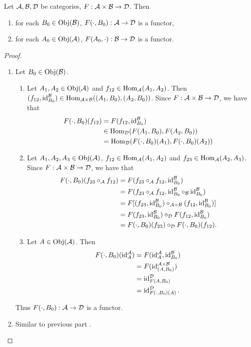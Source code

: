 \documentclass{book}
\begin{document}
	\begin{ex} 
		Let $\mathcal{A}, \mathcal{B}, \mathcal{D}$ be categories, $F: \mathcal{A} \times \mathcal{B} \rightarrow \mathcal{D}$. Then 
		\begin{enumerate}
			\item for each $B_0 \in \operatorname{Obj}(\mathcal{B})$, $F(\cdot, B_0): \mathcal{A} \rightarrow \mathcal{D}$ is a functor,
			\item for each $A_0 \in \operatorname{Obj}(\mathcal{A})$, $F(A_0, \cdot): \mathcal{B} \rightarrow \mathcal{D}$ is a functor.
		\end{enumerate}
	\end{ex}
	
	\begin{proof}\
		\begin{enumerate}
			\item Let $B_0 \in \operatorname{Obj}(\mathcal{B})$.
			\begin{enumerate}
				\item Let $A_1, A_2 \in \operatorname{Obj}(\mathcal{A})$ and $f_{12} \in \operatorname{Hom}_{\mathcal{A}}(A_1, A_2)$. Then $(f_{12}, \operatorname{id}_{B_0}^{\mathcal{B}}) \in \operatorname{Hom}_{\mathcal{A} \times \mathcal{B}}((A_1, B_0), (A_2, B_0))$. Since $F:\mathcal{A} \times \mathcal{B} \rightarrow \mathcal{D}$, we have that
				\begin{align*}
					F(\cdot, B_0)(f_{12})
					& = F(f_{12}, \operatorname{id}_{B_0}^{\mathcal{B}}) \\
					& \in \operatorname{Hom}_{\mathcal{D}}(F(A_1, B_0), F(A_2, B_0)) \\
					& = \operatorname{Hom}_{\mathcal{D}}(F(\cdot, B_0)(A_1), F(\cdot, B_0)(A_2)) \\
				\end{align*}
				\item Let $A_1, A_2, A_3 \in \operatorname{Obj}(\mathcal{A})$, $f_{12} \in \operatorname{Hom}_{\mathcal{A}}(A_1, A_2)$ and $f_{23} \in \operatorname{Hom}_{\mathcal{A}}(A_2, A_3)$. Since $F:\mathcal{A} \times \mathcal{B} \rightarrow \mathcal{D}$, we have that
				\begin{align*}
					F(\cdot, B_0)(f_{23} \circ_{\mathcal{A}} f_{12})
					& = F(f_{23} \circ_{\mathcal{A}} f_{12}, \operatorname{id}_{B_0}^{\mathcal{B}}) \\
					& = F(f_{23} \circ_{\mathcal{A}} f_{12}, \operatorname{id}_{B_0}^{\mathcal{B}} \circ_{\mathcal{B}} \operatorname{id}_{B_0}^{\mathcal{B}}) \\
					& = F[(f_{23}, \operatorname{id}_{B_0}^{\mathcal{B}}) \circ_{\mathcal{A} \times \mathcal{B}} (f_{12}, \operatorname{id}_{B_0}^{\mathcal{B}})] \\
					& = F(f_{23}, \operatorname{id}_{B_0}^{\mathcal{B}}) \circ_{\mathcal{D}} F(f_{12}, \operatorname{id}_{B_0}^{\mathcal{B}}) \\
					& = F(\cdot, B_0)(f_{23}) \circ_{\mathcal{D}} F(\cdot, B_0)(f_{12}).
				\end{align*} 
				\item Let $A \in \operatorname{Obj}(\mathcal{A})$. Then 
				\begin{align*}
					F(\cdot, B_0)(\operatorname{id}_A^{\mathcal{A}}) 
					& = F(\operatorname{id}_A^{\mathcal{A}}, \operatorname{id}_{B_0}^{\mathcal{B}}) \\
					& = F(\operatorname{id}_{(A, B_0)}^{\mathcal{A} \times \mathcal{B}}) \\
					& = \operatorname{id}_{F(A, B_0)}^{\mathcal{D}} \\
					& = \operatorname{id}_{F(\cdot, B_0)(A)}^{\mathcal{D}}.  
				\end{align*}
			\end{enumerate}
			Thus $F(\cdot, B_0):\mathcal{A} \rightarrow \mathcal{D}$ is a functor.
			\item Similar to previous part .
		\end{enumerate}
	\end{proof}
	
\end{document}
